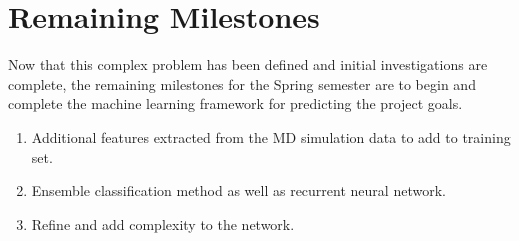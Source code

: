 \section{Remaining Milestones}
Now that this complex problem has been defined and initial investigations are complete, the remaining milestones for the Spring semester are to begin and complete the machine learning framework for predicting the project goals. 

\begin{enumerate}
\item Additional features extracted from the MD simulation data to add to training set.
\item Ensemble classification method as well as recurrent neural network.
\item Refine and add complexity to the network.
\end{enumerate}


